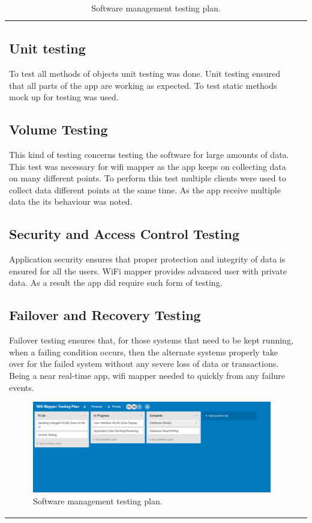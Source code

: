 \begin{table}[h!]
\begin{tabular}[t]{|p{8cm}|p{7cm}|}
\subsection*{Unit testing}
To test all methods of objects unit testing was done. Unit testing ensured that all parts of the app are working as expected. To test static methods mock up for testing was used.

\subsection*{Volume Testing}
This kind of testing concerns testing the software for large amounts of data. This test was necessary for wifi mapper as the app keeps on collecting data on many different points. To perform this test multiple clients were used to collect data different points at the same time. As the app receive multiple data the its behaviour was noted.

\subsection*{Security and Access Control Testing}
Application security ensures that proper protection and integrity of data is ensured for all the users. WiFi mapper provides advanced user with private data. As a result the app did require such form of testing.

\subsection*{Failover and Recovery Testing}
Failover testing ensures that, for those systems that need to be kept running, when a failing condition occurs, then the alternate systems properly take over for the failed system without any severe loss of data or transactions. Being a near real-time app, wifi mapper needed to quickly from any failure events.

\begin{figure}
	\centering
	\includegraphics[width=0.7\linewidth]{images/testing_plan}
	\caption{Software management testing plan.}
	\label{fig:testingplan}
\end{figure}
\newpage


\end{tabular}
\end{table}
